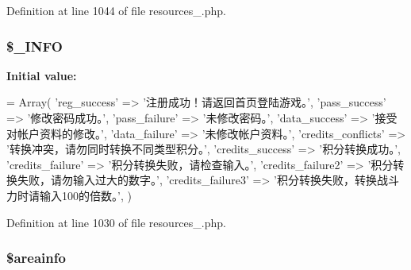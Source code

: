 Definition at line 1044 of file resources\+\_.\+php.

\hypertarget{cache_2resources__1_8php_acc171a42cb2c06ea14b041fc55b5cc24}{
\subsubsection[{\$\+\_\+\+I\+N\+F\+O}]{\setlength{\rightskip}{0pt plus 5cm}\$\+\_\+\+I\+N\+F\+O}}\label{cache_2resources__1_8php_acc171a42cb2c06ea14b041fc55b5cc24}
{\bfseries Initial value\+:}
\begin{DoxyCode}
= Array(
    \textcolor{stringliteral}{'reg\_success'} => \textcolor{stringliteral}{'注册成功！请返回首页登陆游戏。'},
    \textcolor{stringliteral}{'pass\_success'} => \textcolor{stringliteral}{'修改密码成功。'},
    \textcolor{stringliteral}{'pass\_failure'} => \textcolor{stringliteral}{'未修改密码。'},
    \textcolor{stringliteral}{'data\_success'} => \textcolor{stringliteral}{'接受对帐户资料的修改。'},
    \textcolor{stringliteral}{'data\_failure'} => \textcolor{stringliteral}{'未修改帐户资料。'},
    \textcolor{stringliteral}{'credits\_conflicts'} => \textcolor{stringliteral}{'转换冲突，请勿同时转换不同类型积分。'},
    \textcolor{stringliteral}{'credits\_success'} => \textcolor{stringliteral}{'积分转换成功。'},
    \textcolor{stringliteral}{'credits\_failure'} => \textcolor{stringliteral}{'积分转换失败，请检查输入。'},
    \textcolor{stringliteral}{'credits\_failure2'} => \textcolor{stringliteral}{'积分转换失败，请勿输入过大的数字。'},
    \textcolor{stringliteral}{'credits\_failure3'} => \textcolor{stringliteral}{'积分转换失败，转换战斗力时请输入100的倍数。'},
)
\end{DoxyCode}


Definition at line 1030 of file resources\+\_.\+php.

\hypertarget{cache_2resources__1_8php_aabf13bd9fe14d8a463c5f4b334361291}{
\subsubsection[{\$areainfo}]{\setlength{\rightskip}{0pt plus 5cm}\$areainfo}}\label{cache_2resources__1_8php_aabf13bd9fe14d8a463c5f4b334361291}



